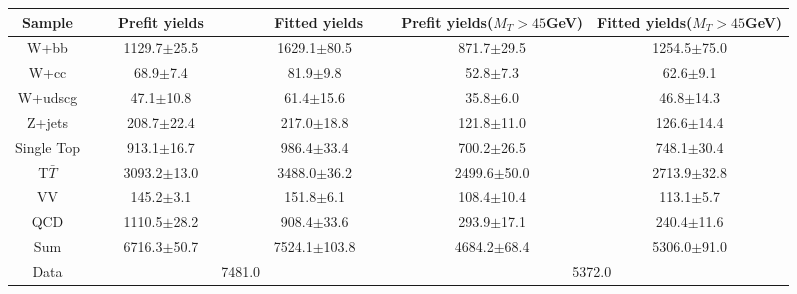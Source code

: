 
 \begin{adjustbox}{width=\textwidth,center=\textwidth}
   \begin{tabular} {c|cc|cc} \hline\hline
			 Sample & ~~~Prefit yields~~~ & ~~~~Fitted yields~~~ & Prefit yields($M_T>45$GeV) & Fitted yields($M_T>45$GeV) \\ 
 \hline
W+bb&1129.7$\pm$25.5&1629.1$\pm$80.5&871.7$\pm$29.5&1254.5$\pm$75.0\\
W+cc&68.9$\pm$7.4&81.9$\pm$9.8&52.8$\pm$7.3&62.6$\pm$9.1\\
W+udscg&47.1$\pm$10.8&61.4$\pm$15.6&35.8$\pm$6.0&46.8$\pm$14.3\\
Z+jets&208.7$\pm$22.4&217.0$\pm$18.8&121.8$\pm$11.0&126.6$\pm$14.4\\
Single Top&913.1$\pm$16.7&986.4$\pm$33.4&700.2$\pm$26.5&748.1$\pm$30.4\\
T$\bar{T}$&3093.2$\pm$13.0&3488.0$\pm$36.2&2499.6$\pm$50.0&2713.9$\pm$32.8\\
VV&145.2$\pm$3.1&151.8$\pm$6.1&108.4$\pm$10.4&113.1$\pm$5.7\\
QCD&1110.5$\pm$28.2&908.4$\pm$33.6&293.9$\pm$17.1&240.4$\pm$11.6\\
\hline
Sum &6716.3$\pm$50.7&7524.1$\pm$103.8&4684.2$\pm$68.4&5306.0$\pm$91.0\\
\hline
Data&\multicolumn{2}{c}{7481.0}&\multicolumn{2}{c}{5372.0}\\
   \hline\hline
   \end{tabular}
 \end{adjustbox}

